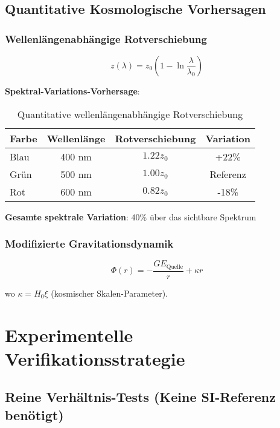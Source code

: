 \documentclass[12pt,a4paper]{article}
\newcommand{\Efield}{E}
\newcommand{\xipar}{\xi}
\theoremstyle{definition}
\theoremstyle{remark}
\begin{document}
	\subsection{Quantitative Kosmologische Vorhersagen}
	
	\subsubsection{Wellenlängenabhängige Rotverschiebung}
	
	\begin{equation}
		z(\lambda) = z_0 \left(1 - \ln\frac{\lambda}{\lambda_0}\right)
		\label{eq:quantitative_redshift}
	\end{equation}
	
	\textbf{Spektral-Variations-Vorhersage}:
	\begin{table}[htbp]
		\centering
		\begin{tabular}{lccc}
			\toprule
			\textbf{Farbe} & \textbf{Wellenlänge} & \textbf{Rotverschiebung} & \textbf{Variation} \\
			\midrule
			Blau & 400 nm & $1.22 z_0$ & +22\% \\
			Grün & 500 nm & $1.00 z_0$ & Referenz \\
			Rot & 600 nm & $0.82 z_0$ & -18\% \\
			\bottomrule
		\end{tabular}
		\caption{Quantitative wellenlängenabhängige Rotverschiebung}
	\end{table}
	
	\textbf{Gesamte spektrale Variation}: 40\% über das sichtbare Spektrum
	
	\subsubsection{Modifizierte Gravitationsdynamik}
	
	\begin{equation}
		\Phi(r) = -\frac{G\Efield_{\text{Quelle}}}{r} + \kappa r
		\label{eq:quantitative_gravity}
	\end{equation}
	
	wo $\kappa = H_0 \xipar$ (kosmischer Skalen-Parameter).
	
	\section{Experimentelle Verifikationsstrategie}
	
	\subsection{Reine Verhältnis-Tests (Keine SI-Referenz benötigt)}
	
\end{document}
